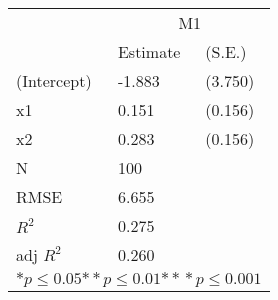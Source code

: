 \begin{tabular}{*{3}{l}}
\hline
                  & \multicolumn{2}{c}{M1}   \tabularnewline
                   &Estimate  &(S.E.)  \tabularnewline
 \hline
 \hline
   (Intercept)     &-1.883   &   (3.750) \tabularnewline
   x1              &0.151   &   (0.156) \tabularnewline
   x2              &0.283   &   (0.156) \tabularnewline
 \hline
 N                 &100       &        \tabularnewline
 RMSE             &6.655         & \tabularnewline
 $R^2$             &0.275         & \tabularnewline
 adj $R^2$         &0.260         & \tabularnewline
 \hline
\hline
 
 \multicolumn{3}{c}{${*  p}\le 0.05$${*\!\!*  p}\le 0.01$${*\!\!*\!\!*  p}\le 0.001$}\tabularnewline
 \end{tabular}